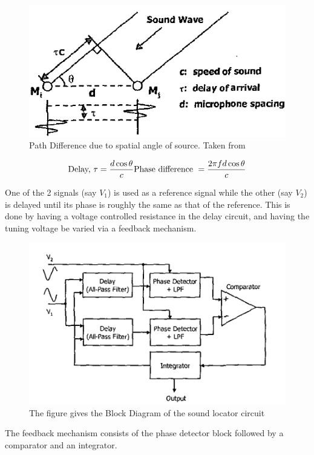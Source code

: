 \documentclass[10pt, conference]{IEEEtran}
\begin{document}
\begin{figure}[hbp]
\includegraphics[width=\columnwidth]{SpatialAngle.jpg}
\caption{Path Difference due to spatial angle of source. Taken from \cite{1031521}}
\label{fig:spatial_angle}
\end{figure}

\begin{equation*}
    \text{Delay, }\tau = \frac{d\cos{\theta}}{c}\\
    \text{Phase difference }= \frac{2\pi f d\cos{\theta} }{c}
\end{equation*}

One of the 2 signals (say $V_1$) is used as a reference signal while the other (say $V_2$) is delayed until its phase is roughly the same as that of the reference. This is done by having a voltage controlled resistance in the delay circuit, and having the tuning voltage be varied via a feedback mechanism.
\begin{figure}[hbp]
\includegraphics[width=\columnwidth]{block_cir.PNG}
\caption{The figure gives the Block Diagram of the sound locator circuit}
\label{fig:block_cir}
\end{figure}
The feedback mechanism consists of the phase detector block followed by a comparator and an integrator.
\end{document}
